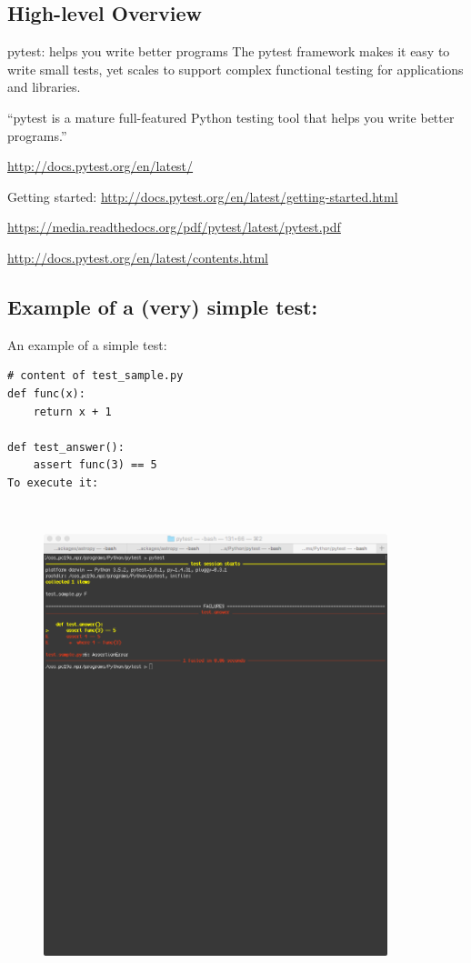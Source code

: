 \documentclass[11pt,a4paper]{article}
\begin{document}
\subsection{High-level Overview}
pytest: helps you write better programs
The pytest framework makes it easy to write small tests, yet scales to support complex functional testing for applications and libraries.

``pytest is a mature full-featured Python testing tool that helps you write better programs.''

\href{http://docs.pytest.org/en/latest/}{http://docs.pytest.org/en/latest/}

Getting started: \href{http://docs.pytest.org/en/latest/getting-started.html}{http://docs.pytest.org/en/latest/getting-started.html}

\href{pytest Documentation (Release 3.0.2.dev)}{https://media.readthedocs.org/pdf/pytest/latest/pytest.pdf}

\href{http://docs.pytest.org/en/latest/contents.html}{http://docs.pytest.org/en/latest/contents.html}

\subsection{Example of a (very) simple test:}

An example of a simple test:
\begin{lstlisting}
# content of test_sample.py
def func(x):
    return x + 1

def test_answer():
    assert func(3) == 5
To execute it:
\end{lstlisting}


\begin{figure}
  \includegraphics [height=14.0cm,width=10.0cm]
  {pytest_screengrab.png}
  \centering
  \caption[]{}
  \label{fig:fig2}
\end{figure}
\end{document}
